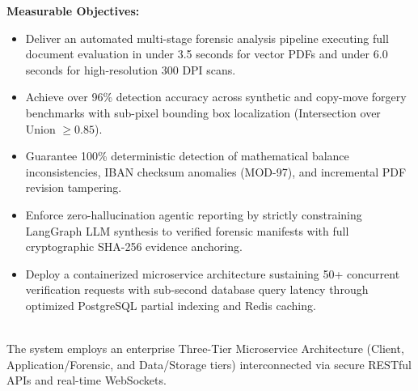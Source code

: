 \documentclass[12pt,a4paper]{article}
\begin{document}
\newpage
\noindent\textbf{Measurable Objectives:}
\begin{itemize}
    \setlength\itemsep{4pt}
    \item Deliver an automated multi-stage forensic analysis pipeline executing full document evaluation in under 3.5 seconds for vector PDFs and under 6.0 seconds for high-resolution 300 DPI scans.
    \item Achieve over 96\% detection accuracy across synthetic and copy-move forgery benchmarks with sub-pixel bounding box localization (Intersection over Union $\ge 0.85$).
    \item Guarantee 100\% deterministic detection of mathematical balance inconsistencies, IBAN checksum anomalies (MOD-97), and incremental PDF revision tampering.
    \item Enforce zero-hallucination agentic reporting by strictly constraining LangGraph LLM synthesis to verified forensic manifests with full cryptographic SHA-256 evidence anchoring.
    \item Deploy a containerized microservice architecture sustaining 50+ concurrent verification requests with sub-second database query latency through optimized PostgreSQL partial indexing and Redis caching.
\end{itemize}

\vspace{10pt}
\\[8pt]
The system employs an enterprise Three-Tier Microservice Architecture (Client, Application/Forensic, and Data/Storage tiers) interconnected via secure RESTful APIs and real-time WebSockets.\\[14pt]
\end{document}
